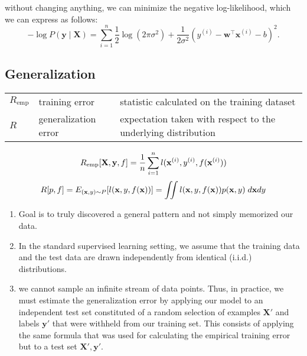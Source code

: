 without changing anything, we can minimize the negative log-likelihood, which we can express as follows:
\[
    \displaystyle
    -\log P(\mathbf y \mid \mathbf X) = \sum_{i=1}^n \frac{1}{2} \log(2 \pi \sigma^2) + \frac{1}{2 \sigma^2} \left(y^{(i)} - \mathbf{w}^\top \mathbf{x}^{(i)} - b\right)^2.
\]

\subsection*{Generalization \cite{dnn-1}}

\begin{customTableWrapper}{1.1}
\begin{table}[H]
    \centering
    \begin{tabular}{l l p{6cm}}
        $R_\textrm{emp}$ & training error & statistic calculated on the training dataset \\
        
        $R$ & generalization error & expectation taken with respect to the underlying distribution \\

    \end{tabular}
\end{table}
\end{customTableWrapper}

\[
    \hfill
    R_\textrm{emp}[\mathbf{X}, \mathbf{y}, f] 
    = \frac{1}{n} \sum_{i=1}^n l(\mathbf{x}^{(i)}, y^{(i)}, f(\mathbf{x}^{(i)}))
    \hfill
\]
\[
    \hfill
    R[p, f] 
    = E_{(\mathbf{x}, y) \sim P} [l(\mathbf{x}, y, f(\mathbf{x}))] 
    = \iint l(\mathbf{x}, y, f(\mathbf{x})) p(\mathbf{x}, y) \;d\mathbf{x} dy
    \hfill
\]

\begin{enumerate}[itemsep=0.2cm]
    \item Goal is to truly discovered a general pattern and not simply memorized our data.

    \item In the standard supervised learning setting, we assume that the training data and the test data are drawn independently from identical (i.i.d.) distributions.

    \item we cannot sample an infinite stream of data points. Thus, in practice, we must estimate the generalization error by applying our model to an independent test set constituted of a random selection of examples $\mathbf{X}'$ and labels $\mathbf{y}'$  that were withheld from our training set. This consists of applying the same formula that was used for calculating the empirical training error but to a test set $\mathbf{X}', \mathbf{y}'$.

    
\end{enumerate}















